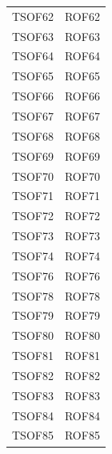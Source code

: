 \documentclass[../PianoDiQualifica_v4.0.0.tex]{subfiles}
\begin{document}
\begin{longtable}[c] { >{\centering\arraybackslash}p{3cm} >{\centering\arraybackslash}p{3cm}}
			TSOF62 & ROF62 \\
			\addlinespace[0.3em]
			\midrule
			\addlinespace[0.3em]
			TSOF63 & ROF63 \\
			\addlinespace[0.3em]
			\midrule
			\addlinespace[0.3em]
			TSOF64 & ROF64 \\
			\addlinespace[0.3em]
			\midrule
			\addlinespace[0.3em]
			TSOF65 & ROF65 \\
			\addlinespace[0.3em]
			\midrule
			\addlinespace[0.3em]
			TSOF66 & ROF66 \\
			\addlinespace[0.3em]
			\midrule
			\addlinespace[0.3em]
			TSOF67 & ROF67 \\
			\addlinespace[0.3em]
			\midrule
			\addlinespace[0.3em]
			TSOF68 & ROF68 \\
			\addlinespace[0.3em]
			\midrule
			\addlinespace[0.3em]
			TSOF69 & ROF69 \\
			\addlinespace[0.3em]
			\midrule
			\addlinespace[0.3em]
			TSOF70 & ROF70 \\
			\addlinespace[0.3em]
			\midrule
			\addlinespace[0.3em]
			TSOF71 & ROF71 \\
			\addlinespace[0.3em]
			\midrule
			\addlinespace[0.3em]
			TSOF72 & ROF72 \\
			\addlinespace[0.3em]
			\midrule
			\addlinespace[0.3em]
			TSOF73 & ROF73 \\
			\addlinespace[0.3em]
			\midrule
			\addlinespace[0.3em]
			TSOF74 & ROF74 \\
			\addlinespace[0.3em]
			\midrule
			\addlinespace[0.3em]
			TSOF76 & ROF76 \\
			\addlinespace[0.3em]
			\midrule
			\addlinespace[0.3em]
			TSOF78 & ROF78 \\
			\addlinespace[0.3em]
			\midrule
			\addlinespace[0.3em]
			TSOF79 & ROF79 \\
			\addlinespace[0.3em]
			\midrule
			\addlinespace[0.3em]
			TSOF80 & ROF80 \\
			\addlinespace[0.3em]
			\midrule
			\addlinespace[0.3em]
			TSOF81 & ROF81 \\
			\addlinespace[0.3em]
			\midrule
			\addlinespace[0.3em]
			TSOF82 & ROF82 \\
			\addlinespace[0.3em]
			\midrule
			\addlinespace[0.3em]
			TSOF83 & ROF83 \\
			\addlinespace[0.3em]
			\midrule
			\addlinespace[0.3em]
			TSOF84 & ROF84\\
			\addlinespace[0.3em]
			\midrule
			\addlinespace[0.3em]
			TSOF85 & ROF85 \\

\end{longtable}
\end{document}
